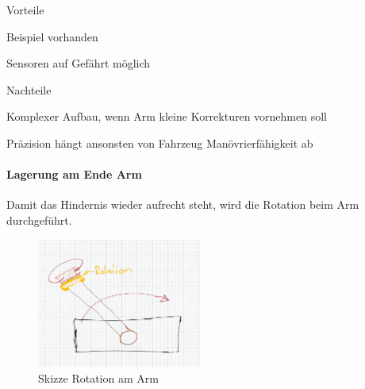 \documentclass[../main.tex]{subfiles}
\begin{document}
\begin{minipage}[t]{0.48\textwidth}
    \begin{items}
          \item [Vorteile]
          \item Beispiel vorhanden
          \item Sensoren auf Gefährt möglich
    \end{items}
\end{minipage}
\hfill
\begin{minipage}[t]{0.48\textwidth}
    \begin{items}
          \item [Nachteile]
          \item Komplexer Aufbau, wenn Arm kleine Korrekturen vornehmen soll
          \item Präzision hängt ansonsten von Fahrzeug Manövrierfähigkeit ab
    \end{items}
\end{minipage}
\newpage
\paragraph{Lagerung am Ende Arm}
Damit das Hindernis wieder aufrecht steht, wird die Rotation beim Arm durchgeführt. 

\begin{figure}[H]
        \centering
        \includegraphics[width=0.48\textwidth]{img/technologierecherche/Rotation/ueberkopf_griff_gelagert.jpg}
        \caption{Skizze Rotation am Arm}
        \label{img:tech_ueberkopf_griff_gelagert}
\end{figure}
\end{document}
